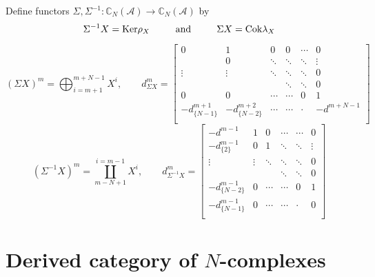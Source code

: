 \documentclass[t,ignorenonframetext]{beamer}
\newcommand{\lrt}{\longrightarrow}
\newcommand{\CA}{\mathcal{A} }
\newcommand{\C}{\mathbb{C} }
\newcommand{\Cok}{{\rm{Cok}}}
\newcommand{\Ker}{{\rm{Ker}}}
\begin{document}
\begin{frame}
Define functors $\Sigma,\Sigma^{-1}:\C_N(\CA)\lrt \C_N(\CA)$ by
$$ \Sigma^{-1} X=\Ker \rho_X \qquad \,\,\,\, \text{and} \qquad \,\,\,\, \Sigma X=\Cok \lambda_X$$
\pause
\begin{tiny}
$$(\Sigma X)^m={\bigoplus}_{i=m+1}^{m+N-1}X^i, \qquad d^{m}_{\Sigma X}=
\left[ \begin{array}{cccccc}


0 & 1 & 0 & 0  &\cdots & 0 \\
 & 0 & \ddots & \ddots & \ddots & \vdots \\
  \vdots & \vdots & \ddots & \ddots & \ddots & 0 \\
   &  &  & \ddots & \ddots & 0 \\
    0 & 0 & \cdots & \cdots & 0 & 1 \\
     -d_{\lbrace N-1\rbrace}^{m+1} & -d_{\lbrace N-2\rbrace}^{m+2} & \cdots & \cdots & \cdot & -d^{m+N-1} \\
\end{array} \right]     
$$
$$(\Sigma^{-1} X)^m={\coprod}^{i=m-1}_{m-N+1}X^i, \qquad d^{m}_{\Sigma^{-1} X}=
\left[ \begin{array}{cccccc}


-d^{m-1} & 1 & 0 & \cdots  &\cdots & 0 \\
-d_{\lbrace 2\rbrace}^{m-1} & 0 & 1 & \ddots & \ddots & \vdots \\
  \vdots & \vdots & \ddots & \ddots & \ddots & 0 \\
   &  &  & \ddots & \ddots & 0 \\
    -d_{\lbrace N-2\rbrace}^{m-1} & 0 & \cdots & \cdots & 0 & 1 \\
     -d_{\lbrace N-1\rbrace}^{m-1} & 0 & \cdots & \cdots & \cdot & 0 \\
\end{array} \right]     
$$
\end{tiny}
\end{frame}

\section{Derived category of $N$-complexes}
\end{document}
